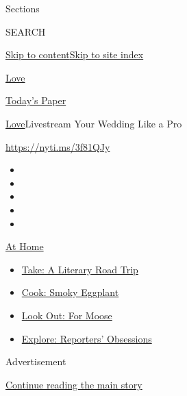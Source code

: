 Sections

SEARCH

\protect\hyperlink{site-content}{Skip to
content}\protect\hyperlink{site-index}{Skip to site index}

\href{https://www.nytimes.com/section/fashion/weddings}{Love}

\href{https://myaccount.nytimes.com/auth/login?response_type=cookie\&client_id=vi}{}

\href{https://www.nytimes.com/section/todayspaper}{Today's Paper}

\href{/section/fashion/weddings}{Love}\textbar{}Livestream Your Wedding
Like a Pro

\url{https://nyti.ms/3f81QJy}

\begin{itemize}
\item
\item
\item
\item
\item
\end{itemize}

\href{https://www.nytimes.com/spotlight/at-home?action=click\&pgtype=Article\&state=default\&region=TOP_BANNER\&context=at_home_menu}{At
Home}

\begin{itemize}
\tightlist
\item
  \href{https://www.nytimes.com/2020/07/28/books/time-for-a-literary-road-trip.html?action=click\&pgtype=Article\&state=default\&region=TOP_BANNER\&context=at_home_menu}{Take:
  A Literary Road Trip}
\item
  \href{https://www.nytimes.com/2020/07/29/magazine/bored-with-your-home-cooking-some-smoky-eggplant-will-fix-that.html?action=click\&pgtype=Article\&state=default\&region=TOP_BANNER\&context=at_home_menu}{Cook:
  Smoky Eggplant}
\item
  \href{https://www.nytimes.com/2020/07/27/travel/moose-michigan-isle-royale.html?action=click\&pgtype=Article\&state=default\&region=TOP_BANNER\&context=at_home_menu}{Look
  Out: For Moose}
\item
  \href{https://www.nytimes.com/interactive/2020/at-home/even-more-reporters-editors-diaries-lists-recommendations.html?action=click\&pgtype=Article\&state=default\&region=TOP_BANNER\&context=at_home_menu}{Explore:
  Reporters' Obsessions}
\end{itemize}

Advertisement

\protect\hyperlink{after-top}{Continue reading the main story}

